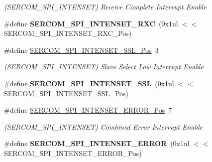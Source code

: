 \begin{DoxyCompactItemize}
\begin{DoxyCompactList}\small\item\em (S\+E\+R\+C\+O\+M\+\_\+\+S\+P\+I\+\_\+\+I\+N\+T\+E\+N\+S\+E\+T) Receive Complete Interrupt Enable \end{DoxyCompactList}\item 
\hypertarget{group___s_a_m_l21___s_e_r_c_o_m_ga9675a139ee683f1eb3bb61cb8f7c6e3a}{}\#define {\bfseries S\+E\+R\+C\+O\+M\+\_\+\+S\+P\+I\+\_\+\+I\+N\+T\+E\+N\+S\+E\+T\+\_\+\+R\+X\+C}~(0x1ul $<$$<$ S\+E\+R\+C\+O\+M\+\_\+\+S\+P\+I\+\_\+\+I\+N\+T\+E\+N\+S\+E\+T\+\_\+\+R\+X\+C\+\_\+\+Pos)\label{group___s_a_m_l21___s_e_r_c_o_m_ga9675a139ee683f1eb3bb61cb8f7c6e3a}

\item 
\hypertarget{group___s_a_m_l21___s_e_r_c_o_m_ga342b072c50eb5d76098e0c0823a0e756}{}\#define \hyperlink{group___s_a_m_l21___s_e_r_c_o_m_ga342b072c50eb5d76098e0c0823a0e756}{S\+E\+R\+C\+O\+M\+\_\+\+S\+P\+I\+\_\+\+I\+N\+T\+E\+N\+S\+E\+T\+\_\+\+S\+S\+L\+\_\+\+Pos}~3\label{group___s_a_m_l21___s_e_r_c_o_m_ga342b072c50eb5d76098e0c0823a0e756}

\begin{DoxyCompactList}\small\item\em (S\+E\+R\+C\+O\+M\+\_\+\+S\+P\+I\+\_\+\+I\+N\+T\+E\+N\+S\+E\+T) Slave Select Low Interrupt Enable \end{DoxyCompactList}\item 
\hypertarget{group___s_a_m_l21___s_e_r_c_o_m_ga8923992b00c8c92d608943e2c9fb36f8}{}\#define {\bfseries S\+E\+R\+C\+O\+M\+\_\+\+S\+P\+I\+\_\+\+I\+N\+T\+E\+N\+S\+E\+T\+\_\+\+S\+S\+L}~(0x1ul $<$$<$ S\+E\+R\+C\+O\+M\+\_\+\+S\+P\+I\+\_\+\+I\+N\+T\+E\+N\+S\+E\+T\+\_\+\+S\+S\+L\+\_\+\+Pos)\label{group___s_a_m_l21___s_e_r_c_o_m_ga8923992b00c8c92d608943e2c9fb36f8}

\item 
\hypertarget{group___s_a_m_l21___s_e_r_c_o_m_gab199ed093f1552871a5712af279f53c9}{}\#define \hyperlink{group___s_a_m_l21___s_e_r_c_o_m_gab199ed093f1552871a5712af279f53c9}{S\+E\+R\+C\+O\+M\+\_\+\+S\+P\+I\+\_\+\+I\+N\+T\+E\+N\+S\+E\+T\+\_\+\+E\+R\+R\+O\+R\+\_\+\+Pos}~7\label{group___s_a_m_l21___s_e_r_c_o_m_gab199ed093f1552871a5712af279f53c9}

\begin{DoxyCompactList}\small\item\em (S\+E\+R\+C\+O\+M\+\_\+\+S\+P\+I\+\_\+\+I\+N\+T\+E\+N\+S\+E\+T) Combined Error Interrupt Enable \end{DoxyCompactList}\item 
\hypertarget{group___s_a_m_l21___s_e_r_c_o_m_gaa353e253b3c6a7083d6aa40632915c76}{}\#define {\bfseries S\+E\+R\+C\+O\+M\+\_\+\+S\+P\+I\+\_\+\+I\+N\+T\+E\+N\+S\+E\+T\+\_\+\+E\+R\+R\+O\+R}~(0x1ul $<$$<$ S\+E\+R\+C\+O\+M\+\_\+\+S\+P\+I\+\_\+\+I\+N\+T\+E\+N\+S\+E\+T\+\_\+\+E\+R\+R\+O\+R\+\_\+\+Pos)\label{group___s_a_m_l21___s_e_r_c_o_m_gaa353e253b3c6a7083d6aa40632915c76}


\end{DoxyCompactItemize}
